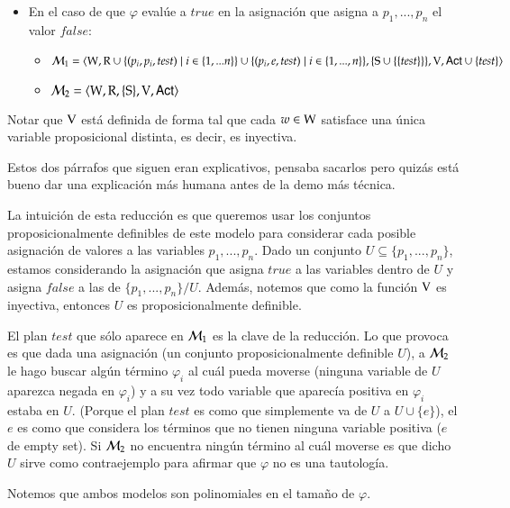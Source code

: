 \begin{demostracion}
\begin{itemize}
        \item En el caso de que $\varphi$ evalúe a $true$ en la asignación que asigna a $p_1,...,p_n$ el valor $false$:
        
        \begin{itemize}
            \item $\mathcal{M}_1=\langle \mathrm{W},\mathrm{R} \cup \{(p_i,p_i,test) \mid i \in \{1,...n\}\} \cup 
                            \{(p_i,e,test)\mid i \in \{1,...,n\}\},\{\mathrm{S} \cup \{\{test\}\} \},\mathrm{V},{\rm \sf Act} \cup \{test\} \rangle$
            \item $\mathcal{M}_2=\langle \mathrm{W},\mathrm{R},\{ \mathrm{S} \},\mathrm{V},{\rm \sf Act} \rangle$
        \end{itemize}
    \end{itemize}

    
    Notar que $\mathrm{V}$ está definida de forma tal que cada $w\in\mathrm{W}$ satisface una única variable proposicional distinta, es decir, 
    es inyectiva.


\medskip\medskip
    Estos dos párrafos que siguen eran explicativos, pensaba sacarlos pero quizás está bueno dar una explicación más humana 
    antes de la demo más técnica.

    La intuición de esta reducción es que queremos usar los conjuntos proposicionalmente definibles de este modelo para considerar 
    cada posible asignación de valores a las variables $p_1,...,p_n$. Dado un conjunto $U \subseteq \{p_1,...,p_n\}$, 
    estamos considerando la asignación que asigna $true$ a las variables dentro de $U$ y asigna $false$ a las de $\{p_1,...,p_n\}/U$. 
    Además, notemos que como la función $\mathrm{V}$ es inyectiva, entonces $U$ es proposicionalmente definible.
 
    El plan $test$ que sólo aparece en $\mathcal{M}_1$ es la clave de la reducción. Lo que provoca es que dada una asignación 
    (un conjunto proposicionalmente definible $U$), a $\mathcal{M}_2$ le hago buscar algún término $\varphi_i$ al cuál pueda moverse 
    (ninguna variable de $U$ aparezca negada en $\varphi_i$) y a su vez todo variable que aparecía positiva en 
    $\varphi_i$ estaba en $U$. (Porque el plan $test$ es como que simplemente va de $U$ a $U \cup \{e\}$), el $e$ es como que 
    considera los términos que no tienen ninguna variable positiva ($e$ de empty set). Si $\mathcal{M}_2$ no encuentra ningún término 
    al cuál moverse es que dicho $U$ sirve como contraejemplo para afirmar que $\varphi$ no es una tautología.

\medskip\medskip
        
    Notemos que ambos modelos son polinomiales en el tamaño de $\varphi$.


\end{demostracion}
